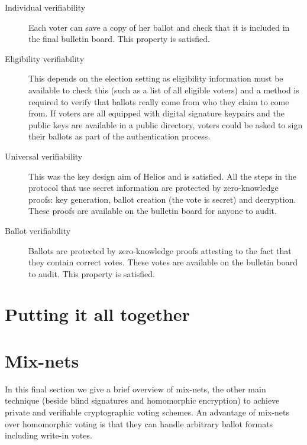 \documentclass{llncs}
\begin{document}
\begin{description}
\item[Individual verifiability]
Each voter can save a copy of her ballot and check that it is included in the
final bulletin board. This property is satisfied.

\item[Eligibility verifiability]
This depends on the election setting as eligibility information must be
available to check this (such as a list of all eligible voters) and a method is
required to verify that ballots really come from who they claim to come from. If
voters are all equipped with digital signature keypairs and the public keys are
available in a public directory, voters could be asked to sign their ballots as
part of the authentication process.

\item[Universal verifiability]
This was the key design aim of Helios and is satisfied. All the steps in the
protocol that use secret information are protected by zero-knowledge proofs:
key generation, ballot creation (the vote is secret) and decryption. These
proofs are available on the bulletin board for anyone to audit.

\item[Ballot verifiability]
Ballots are protected by zero-knowledge proofs attesting to the fact that they
contain correct votes. These votes are available on the bulletin board to audit.
This property is satisfied\footnotemark.
\end{description}


\section{Putting it all together}

\section{Mix-nets}

In this final section we give a brief overview of mix-nets, the other main
technique (beside blind signatures and homomorphic encryption) to achieve
private and verifiable cryptographic voting schemes. An advantage of mix-nets
over homomorphic voting is that they can handle arbitrary ballot formats
including write-in votes.
\end{document}
